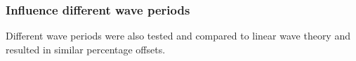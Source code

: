 
\subsubsection{Influence different wave periods}
Different wave periods were also tested and compared to linear wave theory and resulted in similar percentage offsets. 



